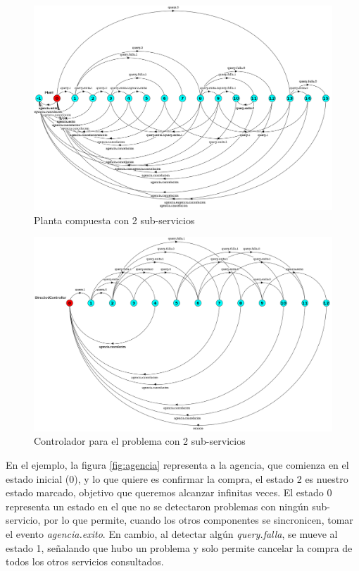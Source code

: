 \begin{figure}[htb]
	\includegraphics[width=\linewidth]{figures/ejemploServicios/N2Planta.png}  
	\caption{Planta compuesta con 2 sub-servicios}
	\label{fig:N2}
\end{figure}

\begin{figure}[htb]
	\includegraphics[width=\linewidth]{figures/ejemploServicios/N2Controlador.png}  
	\caption{Controlador para el problema con 2 sub-servicios}
	\label{fig:N2-control}
\end{figure}

En el ejemplo, la figura \ref{fig:agencia} representa a la agencia, que comienza en el estado inicial (0), y lo que quiere es confirmar la compra, el estado 2 es nuestro estado marcado, objetivo que queremos alcanzar infinitas veces. El estado 0 representa un estado en el que no se detectaron problemas con ningún sub-servicio, por lo que permite, cuando los otros componentes se sincronicen, tomar el evento \textit{agencia.exito}. En cambio, al detectar algún \textit{query.falla}, se mueve al estado 1, señalando que hubo un problema y solo permite cancelar la compra de todos los otros servicios consultados.


